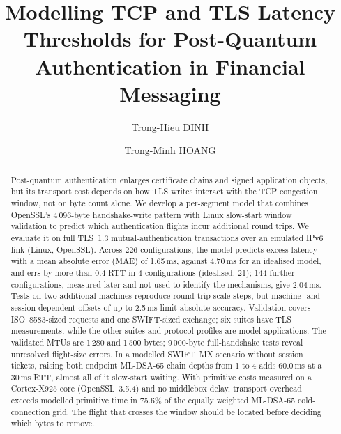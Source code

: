 \documentclass[preprint,12pt]{elsarticle}
\newcommand{\ms}{\,ms\xspace}
\begin{document}
\begin{frontmatter}

\title{Modelling TCP and TLS Latency Thresholds for Post-Quantum Authentication in Financial Messaging}

\author[1]{Trong-Hieu DINH}
\author[2]{Trong-Minh HOANG}

\begin{abstract}
Post-quantum authentication enlarges certificate chains and signed application objects, but its transport cost depends on how TLS writes interact with the TCP congestion window, not on byte count alone. We develop a per-segment model that combines OpenSSL's 4\,096-byte handshake-write pattern with Linux slow-start window validation to predict which authentication flights incur additional round trips. We evaluate it on full TLS~1.3 mutual-authentication transactions over an emulated IPv6 link (Linux, OpenSSL). Across 226 configurations, the model predicts excess latency with a mean absolute error (MAE) of 1.65\ms, against 4.70\ms for an idealised model, and errs by more than 0.4 RTT in 4 configurations (idealised: 21); 144 further configurations, measured later and not used to identify the mechanisms, give 2.04\ms. Tests on two additional machines reproduce round-trip-scale steps, but machine- and session-dependent offsets of up to 2.5\ms limit absolute accuracy. Validation covers ISO~8583-sized requests and one SWIFT-sized exchange; six suites have TLS measurements, while the other suites and protocol profiles are model applications. The validated MTUs are 1\,280 and 1\,500 bytes; 9\,000-byte full-handshake tests reveal unresolved flight-size errors. In a modelled SWIFT~MX scenario without session tickets, raising both endpoint ML-DSA-65 chain depths from 1 to 4 adds 60.0\ms at a 30\ms RTT, almost all of it slow-start waiting. With primitive costs measured on a Cortex-X925 core (OpenSSL~3.5.4) and no middlebox delay, transport overhead exceeds modelled primitive time in 75.6\% of the equally weighted ML-DSA-65 cold-connection grid. The flight that crosses the window should be located before deciding which bytes to remove.
\end{abstract}


\end{frontmatter}
\end{document}
